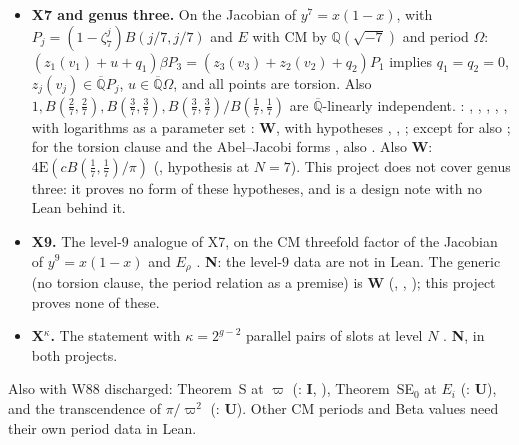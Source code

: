\documentclass[11pt]{amsart}
\theoremstyle{definition}
\theoremstyle{remark}
\numberwithin{equation}{section}
\newcommand{\ZZ}{\mathbb{Z}}
\newcommand{\QQ}{\mathbb{Q}}
\newcommand{\Qbar}{\overline{\mathbb{Q}}}
\newcommand{\vp}{\varpi}
\begin{document}
\begin{itemize}
fibre values replaced by $\ZZ\bar P$. : , ,
, , , from ,
, within the scope of Theorem~\ref{thm:abvarv}: \textbf{U}. The $K$-form with logarithms of
$A^\natural$ among the data, : \textbf{W} ().
\item \textbf{X7 and genus three.} On the Jacobian of $y^7=x(1-x)$, with $P_j=(1-\zeta_7^j)B(j/7,j/7)$ and $E$ with CM by
$\QQ(\sqrt{-7})$ and period $\Omega$: $(z_1(v_1)+u+q_1)\beta P_3=(z_3(v_3)+z_2(v_2)+q_2)P_1$ implies $q_1=q_2=0$,
$z_j(v_j)\in\Qbar P_j$, $u\in\Qbar\Omega$, and all points are torsion. Also $1,B(\frac27,\frac27),B(\frac37,\frac37),
B(\frac37,\frac37)/B(\frac17,\frac17)$ are $\Qbar$-linearly independent. : , ,
, , , with logarithms as a parameter set : \textbf{W}, with hypotheses
, , ; except for  also ; for the torsion
clause and the Abel--Jacobi forms ,  also . Also \textbf{W}:
$\mathrm{4E}(cB(\frac17,\frac17)/\pi)$ (, hypothesis  at $N=7$). This project does not cover
genus three: it proves no form of these hypotheses, and  is a design note with no Lean behind it.
\item \textbf{X9.} The level-$9$ analogue of X7, on the CM threefold factor of the Jacobian of $y^9=x(1-x)$ and $E_\rho$
\cite{MstarPaper}.
\textbf{N}: the level-$9$ data are not in Lean. The generic  (no torsion clause, the period relation
as a premise) is \textbf{W} (, , ); this project
proves none of these.
\item \textbf{X$^\kappa$.} The statement with $\kappa=2^{g-2}$ parallel pairs of slots at level $N$ \cite{MstarPaper}.
\textbf{N}, in both projects.
\end{itemize}
Also with W88 discharged: Theorem~S at $\vp$ (: \textbf{I}, ), Theorem~SE$_0$ at
$E_i$ (: \textbf{U}), and the transcendence of $\pi/\vp^2$
(: \textbf{U}). Other CM periods and Beta values need their own period data in Lean.
\end{document}
